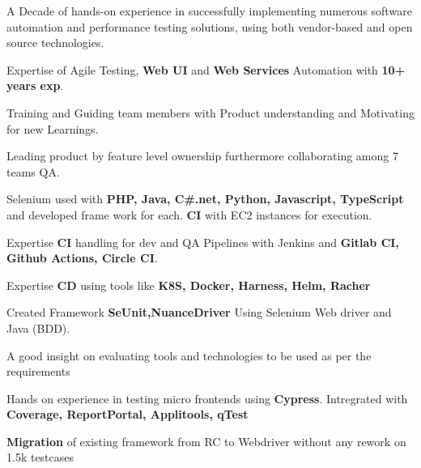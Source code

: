 

\begin{cventries}
\begin{cvitemize}
 \item {A Decade of hands-on experience in successfully implementing numerous software automation and performance testing solutions, using both vendor-based and open source technologies.}
 \item {Expertise of Agile Testing, \textbf{Web UI} and \textbf{Web Services} Automation with \textbf{10+ years exp}.}
 \item {Training and Guiding team members with Product understanding and Motivating for new Learnings.}
 \item {Leading product by feature level ownership furthermore collaborating among 7 teams QA.}
 \item {Selenium used with \textbf{PHP, Java, C\#.net, Python, Javascript, TypeScript} and developed frame work for each. \textbf{CI} with EC2 instances for execution.}
 
 \item {Expertise \textbf{CI} handling for dev and QA Pipelines with Jenkins and \textbf{Gitlab CI, Github Actions, Circle CI}}.
 
 \item {Expertise \textbf{CD} using tools like \textbf{K8S, Docker, Harness, Helm, Racher}}

 \item {Created Framework \textbf{SeUnit,NuanceDriver} Using Selenium Web driver and Java (BDD).}
 
 \item {A good insight on evaluating tools and technologies to be used as per the requirements}
 
 \item {Hands on experience in testing micro frontends using \textbf{Cypress}. Intregrated with \textbf{Coverage, ReportPortal, Applitools, qTest}} 

 \item {\textbf{Migration} of existing framework from RC to Webdriver without any rework on 1.5k testcases}


\end{cvitemize}
\end{cventries}
